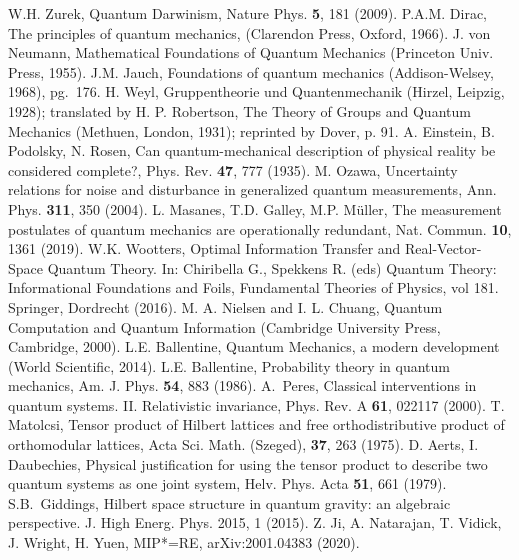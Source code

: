 \documentclass[aps,prl,amsmath,amssymb,twocolumn,nofootinbib]{revtex4}
\theoremstyle{plain}
\theoremstyle{definition}
\theoremstyle{remark}
\begin{document}
	\begin{references}
		 W.H. Zurek, Quantum Darwinism, Nature Phys. {\bf 5},
		181 (2009).
		P.A.M. Dirac, The principles of quantum mechanics,
		(Clarendon Press, Oxford, 1966).
		J. von Neumann, Mathematical Foundations of
		Quantum Mechanics (Princeton Univ.  Press, 1955).
		J.M. Jauch, Foundations of quantum mechanics
		(Addison-Welsey, 1968), pg.~176.
		 H. Weyl, Gruppentheorie und Quantenmechanik (Hirzel,
		Leipzig, 1928); translated by H. P. Robertson, The Theory of Groups
		and Quantum Mechanics (Methuen, London, 1931); reprinted by Dover,
		p. 91.
		A. Einstein, B. Podolsky, N. Rosen, Can
		quantum-mechanical description of physical reality be considered
		complete?, Phys. Rev. {\bf 47}, 777 (1935).
		M. Ozawa, {Uncertainty relations for noise and
			disturbance in generalized quantum measurements}, Ann. Phys.  {\bf
			311}, 350 (2004).
		L. Masanes, T.D. Galley, M.P. M\" uller, The
		measurement postulates of quantum mechanics are operationally
		redundant, Nat. Commun. {\bf 10}, 1361 (2019).
		W.K. Wootters, Optimal Information Transfer and
		Real-Vector-Space Quantum Theory. In: Chiribella G., Spekkens R.
		(eds) Quantum Theory: Informational Foundations and Foils,
		Fundamental Theories of Physics, vol 181. Springer, Dordrecht
		(2016).
		M. A. Nielsen and I. L. Chuang, Quantum Computation
		and Quantum Information (Cambridge University Press, Cambridge,
		2000).
		L.E. Ballentine, Quantum Mechanics, a modern
		development (World Scientific, 2014).
		L.E. Ballentine, Probability theory in
		quantum mechanics, Am. J. Phys. {\bf 54}, 883 (1986).
		A.~Peres, Classical interventions in quantum systems.
		II. Relativistic invariance, Phys. Rev. A {\bf 61}, 022117 (2000).
		 T. Matolcsi, Tensor product of Hilbert lattices and
		free orthodistributive product of orthomodular lattices, Acta Sci.
		Math. (Szeged), {\bf 37}, 263 (1975).
		 D. Aerts, I. Daubechies, Physical justification for
		using the tensor product to describe two quantum systems as one
		joint system, Helv. Phys. Acta {\bf 51}, 661 (1979).
		S.B.~Giddings, Hilbert space structure in quantum
		gravity: an algebraic perspective. J. High Energ. Phys. 2015, 1
		(2015).%
		Z. Ji, A. Natarajan, T. Vidick, J. Wright, H. Yuen, MIP*=RE, arXiv:2001.04383 (2020). %

\end{references}
\end{document}
